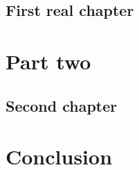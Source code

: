 \documentclass[english,BCOR=5mm,DIV=12,fontsize=10pt]{book}
\begin{document}
\chapter{First real chapter}
\label{ch:1}
    

\part{Part two}
\label{part:2}

\chapter{Second chapter}
\label{ch:2}
    


\part{Conclusion}


\appendix


\nocite{*} %
% 



\end{document}
